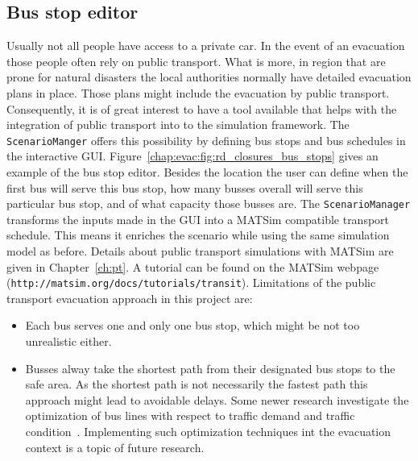 \subsection{Bus stop editor}
Usually not all people have access to a private car. In the event of an evacuation those people often rely on public transport. What is more, in region that are prone for natural disasters the local authorities normally have detailed evacuation plans in place. Those plans might include the evacuation by public transport. Consequently, it is of great interest to have a tool available that helps with the integration of public transport into to the simulation framework. The \lstinline+ScenarioManger+ offers this possibility by defining bus stops and bus schedules in the interactive GUI. Figure~\ref{chap:evac:fig:rd_closures_bus_stops} gives an example of the bus stop editor. Besides the location the user can define when the first bus will serve this bus stop, how many busses overall will serve this particular bus stop, and of what capacity those busses are. 
The \lstinline+ScenarioManager+ transforms the inputs made in the GUI into a MATSim compatible transport schedule. This means it enriches the scenario while using the same simulation model as before. Details about public transport simulations with MATSim are given in Chapter~\ref{ch:pt}. A tutorial can be found on the MATSim webpage (\lstinline+http://matsim.org/docs/tutorials/transit+).
Limitations of the public transport evacuation approach in this project are:
\begin{itemize}
\item Each bus serves one and only one bus stop, which might be not too unrealistic either.
\item Busses alway take the shortest path from their designated bus stops to the safe area. As the shortest path is not necessarily the fastest path this approach might lead to avoidable delays. Some newer research investigate the optimization of bus lines with respect to traffic demand and traffic condition~\citep{Neumann_PhDThesis_2014}. Implementing such optimization techniques int the evacuation context is a topic of future research.
\end{itemize}


